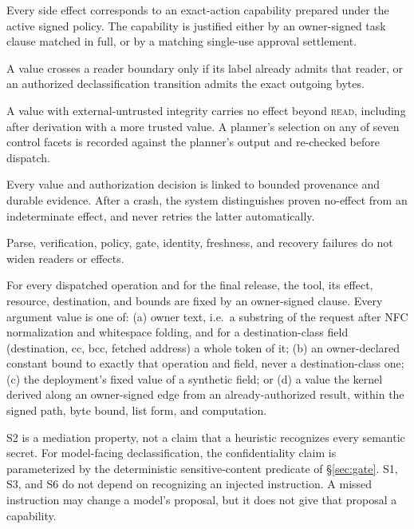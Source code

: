\documentclass[letterpaper,twocolumn,10pt]{article}
\newcommand{\READ}{\textsc{read}}
\begin{document}
\begin{description}[style=nextline,font=\bfseries]
\item[S1 Effect authorization.] Every side effect corresponds to an
  exact-action capability prepared under the active signed policy. The
  capability is justified either by an owner-signed task clause matched in
  full, or by a matching single-use approval settlement.
\item[S2 Disclosure confinement.] A value crosses a reader boundary only if
  its label already admits that reader, or an authorized declassification
  transition admits the exact outgoing bytes.
\item[S3 No authority from untrusted data or choice.] A value with
  external-untrusted integrity carries no effect beyond \READ, including
  after derivation with a more trusted value. A planner's selection on any
  of seven control facets is recorded against the planner's output and
  re-checked before dispatch.
\item[S4 Recoverable attribution.] Every value and authorization decision is
  linked to bounded provenance and durable evidence. After a crash, the
  system distinguishes proven no-effect from an indeterminate effect, and
  never retries the latter automatically.
\item[S5 Fail-closed mediation.] Parse, verification, policy, gate,
  identity, freshness, and recovery failures do not widen readers or
  effects.
\item[S6 Origin confinement.] For every dispatched operation and for the
  final release, the tool, its effect, resource, destination, and bounds
  are fixed by an owner-signed clause. Every argument value is one of:
  (a) owner text, i.e.\ a substring of the request after NFC normalization
  and whitespace folding, and for a destination-class field (destination,
  cc, bcc, fetched address) a whole token of it; (b) an owner-declared
  constant bound to exactly that operation and field, never a
  destination-class one; (c) the deployment's fixed value of a synthetic
  field; or (d) a value the kernel derived along an owner-signed edge from
  an already-authorized result, within the signed path, byte bound, list
  form, and computation.
\end{description}

S2 is a mediation property, not a claim that a heuristic recognizes every
semantic secret. For model-facing declassification, the confidentiality
claim is parameterized by the deterministic sensitive-content predicate of
\S\ref{sec:gate}. S1, S3, and S6 do not depend on recognizing an injected
instruction. A missed instruction may change a model's proposal, but it does
not give that proposal a capability.
\end{document}
